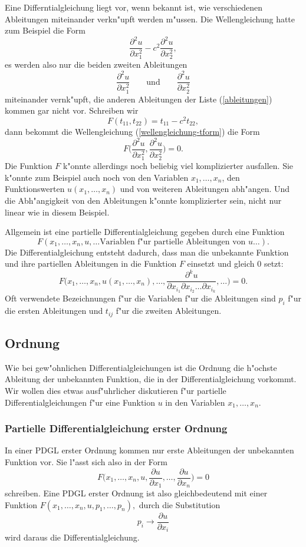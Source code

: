 Eine Differntialgleichung liegt vor, wenn bekannt ist, wie verschiedenen
Ableitungen miteinander verkn"upft werden m"ussen.
Die Wellengleichung hatte zum Beispiel die Form
\begin{equation}
\frac{\partial^2 u}{\partial x_1^2}
-
c^2\frac{\partial^2 u}{\partial x_2^2},
\label{wellengleichung-tform}
\end{equation}
es werden also nur die beiden zweiten Ableitungen
\[
\frac{\partial^2 u}{\partial x_1^2}
\qquad
\text{und}
\qquad
\frac{\partial^2 u}{\partial x_2^2}
\]
miteinander vernk"upft, die anderen Ableitungen der Liste
(\ref{ableitungen}) kommen gar nicht vor.
Schreiben wir
\[
F(t_{11}, t_{22}) = t_{11} -c^2t_{22},
\]
dann bekommt die Wellengleichung (\ref{wellengleichung-tform})
die Form
\[
F\biggl(
\frac{\partial^2 u}{\partial x_1^2},
\frac{\partial^2 u}{\partial x_2^2}
\biggr)=0.
\]
Die Funktion $F$ k"onnte allerdings noch beliebig viel komplizierter
ausfallen.
Sie k"onnte zum Beispiel auch noch von den Variablen $x_1,\dots,x_n$,
den Funktionswerten $u(x_1,\dots,x_n)$ und von weiteren Ableitungen
abh"angen.
Und die Abh"angigkeit von den Ableitungen k"onnte komplizierter sein,
nicht nur linear wie in diesem Beispiel.

Allgemein ist eine partielle Differentialgleichung gegeben
durch eine Funktion
\[
F(x_1,\dots,x_n,u,\dots\text{Variablen f"ur partielle Ableitungen von $u$}\dots).
\]
Die Differentialgleichung
entsteht dadurch, dass man die unbekannte Funktion
und ihre partiellen Ableitungen in die Funktion $F$ einsetzt und
gleich $0$ setzt:
\[
F\biggl(x_1,\dots,x_n,u(x_1,\dots,x_n),\dots,
\frac{\partial^k u}{\partial x_{i_1}\partial x_{i_2}\dots \partial x_{i_k}},\dots\biggr)=0.
\]
Oft verwendete Bezeichnungen f"ur die Variablen f"ur die Ableitungen sind
$p_i$ f"ur die ersten Ableitungen und $t_{ij}$ f"ur die zweiten Ableitungen.


\subsection{Ordnung\label{klassifikation:ordnung}}
Wie bei gew"ohnlichen Differentialgleichungen ist die Ordnung
die h"ochste Ableitung der unbekannten Funktion, die in der
Differentialgleichung vorkommt. Wir wollen dies etwas ausf"uhrlicher
diskutieren f"ur partielle Differentialgleichungen f"ur eine Funktion
$u$ in den Variablen $x_1,\dots,x_n$.

\subsubsection{Partielle Differentialgleichung erster Ordnung}
In einer PDGL erster Ordnung kommen nur erste Ableitungen der
unbekannten Funktion vor.
Sie l"asst sich also in der Form 
\[
F\biggl(x_1,\dots,x_n, u, \frac{\partial u}{\partial x_1},\dots,\frac{\partial u}{\partial x_n}\biggr)=0
\]
schreiben. Eine PDGL erster Ordnung ist also gleichbedeutend mit einer
Funktion 
$F(x_1,\dots,x_n,u,p_1,\dots,p_n),$
durch die Substitution
\[
p_i\to \frac{\partial u}{\partial x_i}
\]
wird daraus die Differentialgleichung.

